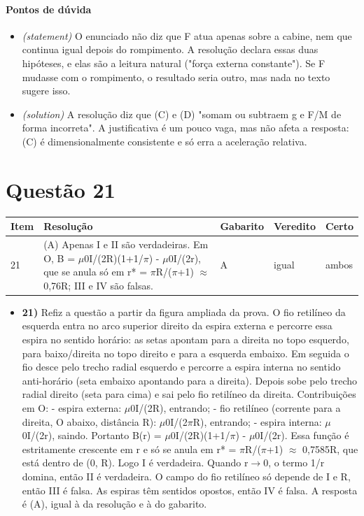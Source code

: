 \documentclass{article}%
\begin{document}
\paragraph{Pontos de dúvida}%
\begin{itemize}%
\item%
\textit{(statement)} O enunciado não diz que F atua apenas sobre a cabine, nem que continua igual depois do rompimento. A resolução declara essas duas hipóteses, e elas são a leitura natural ("força externa constante"). Se F mudasse com o rompimento, o resultado seria outro, mas nada no texto sugere isso.%
\item%
\textit{(solution)} A resolução diz que (C) e (D) "somam ou subtraem g e F/M de forma incorreta". A justificativa é um pouco vaga, mas não afeta a resposta: (C) é dimensionalmente consistente e só erra a aceleração relativa.%
\end{itemize}%
\section*{Questão 21}%
\begin{longtable}{@{}p{} p{} p{} p{} p{}@{}}\toprule Item & Resolução & Gabarito & Veredito & Certo \\ \midrule
21 & (A) Apenas I e II são verdadeiras. Em O, B = $\mu$0I/(2R)(1+1/$\pi$) - $\mu$0I/(2r), que se anula só em r* = $\pi$R/($\pi$+1) $\approx$ 0,76R; III e IV são falsas. & A & igual & ambos \\
\bottomrule\end{longtable}%
\begin{itemize}%
\item%
\textbf{21)} Refiz a questão a partir da figura ampliada da prova. O fio retilíneo da esquerda entra no arco superior direito da espira externa e percorre essa espira no sentido horário: as setas apontam para a direita no topo esquerdo, para baixo/direita no topo direito e para a esquerda embaixo. Em seguida o fio desce pelo trecho radial esquerdo e percorre a espira interna no sentido anti{-}horário (seta embaixo apontando para a direita). Depois sobe pelo trecho radial direito (seta para cima) e sai pelo fio retilíneo da direita.\newline%
\newline%
Contribuições em O:\newline%
{-} espira externa: $\mu$0I/(2R), entrando;\newline%
{-} fio retilíneo (corrente para a direita, O abaixo, distância R): $\mu$0I/(2$\pi$R), entrando;\newline%
{-} espira interna: $\mu$0I/(2r), saindo.\newline%
\newline%
Portanto B(r) = $\mu$0I/(2R)(1+1/$\pi$) - $\mu$0I/(2r). Essa função é estritamente crescente em r e só se anula em r* = $\pi$R/($\pi$+1) $\approx$ 0,7585R, que está dentro de (0, R). Logo I é verdadeira. Quando r$\to$0, o termo 1/r domina, então II é verdadeira. O campo do fio retilíneo só depende de I e R, então III é falsa. As espiras têm sentidos opostos, então IV é falsa. A resposta é (A), igual à da resolução e à do gabarito.%
\end{itemize}%
\end{document}
